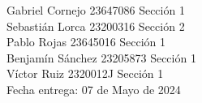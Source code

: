 \documentclass[letterpaper]{article}
\begin{document}
\vspace*{30mm}
\flushright

Gabriel Cornejo 23647086 Sección 1\\
Sebastián Lorca 23200316 Sección 2\\
Pablo Rojas 23645016 Sección 1\\
Benjamín Sánchez  23205873 Sección 1\\
Víctor Ruiz 2320012J Sección 1\\


\vspace*{5mm}
{\large Fecha entrega: 07 de Mayo de 2024\\}

\newpage
\begin{flushleft}
	\tableofcontents
\end{flushleft}
\end{document}
